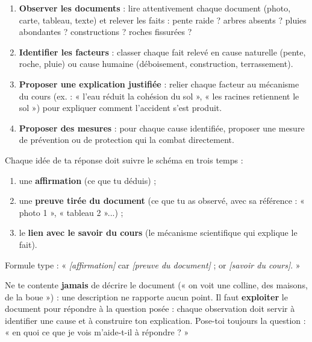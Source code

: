 \documentclass[11pt]{article}
\begin{document}
\begin{methode}
\begin{enumerate}
\item \textbf{Observer les documents} : lire attentivement chaque document (photo, carte, tableau, texte) et relever les faits : pente raide ? arbres absents ? pluies abondantes ? constructions ? roches fissurées ?
\item \textbf{Identifier les facteurs} : classer chaque fait relevé en cause naturelle (pente, roche, pluie) ou cause humaine (déboisement, construction, terrassement).
\item \textbf{Proposer une explication justifiée} : relier chaque facteur au mécanisme du cours (ex. : « l'eau réduit la cohésion du sol », « les racines retiennent le sol ») pour expliquer comment l'accident s'est produit.
\item \textbf{Proposer des mesures} : pour chaque cause identifiée, proposer une mesure de prévention ou de protection qui la combat directement.
\end{enumerate}
\end{methode}

\begin{methode}
Chaque idée de ta réponse doit suivre le schéma en trois temps :
\begin{enumerate}
\item une \textbf{affirmation} (ce que tu déduis) ;
\item une \textbf{preuve tirée du document} (ce que tu as observé, avec sa référence : « photo 1 », « tableau 2 »...) ;
\item le \textbf{lien avec le savoir du cours} (le mécanisme scientifique qui explique le fait).
\end{enumerate}
Formule type : « \emph{[affirmation]} car \emph{[preuve du document]} ; or \emph{[savoir du cours]}. »
\end{methode}

\begin{attention}
Ne te contente \textbf{jamais} de décrire le document (« on voit une colline, des maisons, de la boue ») : une description ne rapporte aucun point. Il faut \textbf{exploiter} le document pour répondre à la question posée : chaque observation doit servir à identifier une cause et à construire ton explication. Pose-toi toujours la question : « en quoi ce que je vois m'aide-t-il à répondre ? »
\end{attention}
\end{document}
